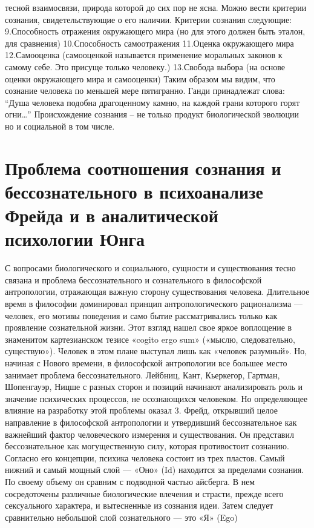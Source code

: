 \documentclass[12pt]{article}
\begin{document}
тесной взаимосвязи, природа которой до сих пор не ясна.
Можно вести критерии сознания, свидетельствующие о его наличии. Критерии сознания следующие:
9.Способность отражения окружающего мира (но для этого должен быть эталон, для сравнения)
10.Способность самоотражения
11.Оценка окружающего мира 
12.Самооценка (самооценкой называется применение моральных законов к самому себе. Это присуще только
человеку.)
13.Свобода выбора (на основе оценки окружающего мира и самооценки)
Таким образом мы видим, что сознание человека по меньшей мере пятигранно. Ганди принадлежат слова:
“Душа человека подобна драгоценному камню, на каждой грани которого горят огни…”
Происхождение сознания – не только продукт биологической эволюции но и социальной в том числе.


\newpage
\section{Проблема соотношения сознания и бессознательного в психоанализе Фрейда и в аналитической психологии Юнга}
С вопросами биологического и социального, сущности и существования тесно связана и проблема
бессознательного и сознательного в философской антропологии, отражающая важную сторону существования
человека.
Длительное время в философии доминировал принцип антропологического рационализма — человек, его
мотивы поведения и само бытие рассматривались только как проявление сознательной жизни. Этот взгляд
нашел свое яркое воплощение в знаменитом картезианском тезисе «cogito ergo sum» («мыслю, следовательно,
существую»). Человек в этом плане выступал лишь как «человек разумный». Но, начиная с Нового времени, в
философской антропологии все большее место занимает проблема бессознательного.
Лейбниц, Кант, Кьеркегор, Гартман, Шопенгауэр, Ницше с разных сторон и позиций начинают анализировать
роль и значение психических процессов, не осознающихся человеком.
Но определяющее влияние на разработку этой проблемы оказал 3. Фрейд, открывший целое направление в
философской антропологии и утвердивший бессознательное как важнейший фактор человеческого измерения и
существования. Он представил бессознательное как могущественную силу, которая противостоит сознанию.
Согласно его концепции, психика человека состоит из трех пластов. Самый нижний и самый мощный слой —
«Оно» (Id) находится за пределами сознания. По своему объему он сравним с подводной частью айсберга. В
нем сосредоточены различные биологические влечения и страсти, прежде всего сексуального характера, и
вытесненные из сознания идеи. Затем следует сравнительно небольшой слой сознательного — это «Я» (Ego)
\end{document}
